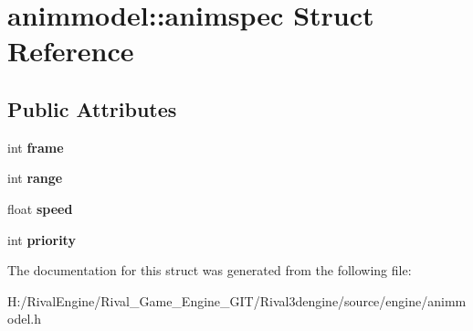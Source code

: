 \hypertarget{structanimmodel_1_1animspec}{}\section{animmodel\+:\+:animspec Struct Reference}
\label{structanimmodel_1_1animspec}
\subsection*{Public Attributes}
\begin{DoxyCompactItemize}
\item 
\mbox{\label{structanimmodel_1_1animspec_acab48550aa1e9a2e4fd2e3a6891c738d}} 
int {\bfseries frame}
\item 
\mbox{\label{structanimmodel_1_1animspec_a36f5f5faa201eaa4073bc487d3fba138}} 
int {\bfseries range}
\item 
\mbox{\label{structanimmodel_1_1animspec_a40ce587fca55bd1e2c89f9f961551e89}} 
float {\bfseries speed}
\item 
\mbox{\label{structanimmodel_1_1animspec_ae45450fdabf29ebf6a10cfb0d7e4f52c}} 
int {\bfseries priority}
\end{DoxyCompactItemize}


The documentation for this struct was generated from the following file\+:\begin{DoxyCompactItemize}
\item 
H\+:/\+Rival\+Engine/\+Rival\+\_\+\+Game\+\_\+\+Engine\+\_\+\+G\+I\+T/\+Rival3dengine/source/engine/animmodel.\+h\end{DoxyCompactItemize}
